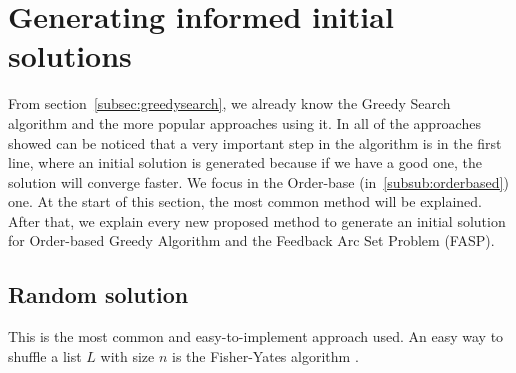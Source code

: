 \section{Generating informed initial solutions}
\label{sec:improve}

From section~\ref{subsec:greedysearch}, we already know the Greedy Search algorithm and the more popular approaches using it. In all of the approaches showed can be noticed that a very important step in the algorithm is in the first line, where an initial solution is generated because if we have a good one, the solution will converge faster. We focus in the Order-base (in~\ref{subsub:orderbased}) one. At the start of this section, the most common method will be explained. After that, we explain every new proposed method to generate an initial solution for Order-based Greedy Algorithm and the Feedback Arc Set Problem (FASP).

\subsection{Random solution}
\label{subsec:randomapproach}
	This is the most common and easy-to-implement approach used. An easy way to shuffle a list $L$ with size $n$ is the Fisher-Yates algorithm \cite{FisherYates98}.

